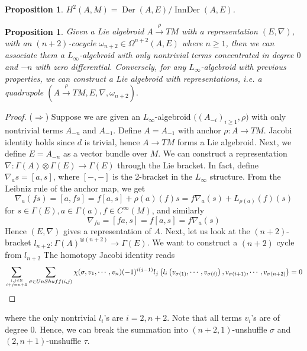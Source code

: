 \documentclass[12pt]{amsart}
\newtheorem{prop}[thm]{Proposition}
\theoremstyle{definition}
\theoremstyle{remark}
\numberwithin{equation}{section}
\newcommand{\1}{{\mathbb{1}}}
\newcommand{\der}{\operatorname{Der}}
\newcommand{\ider}{\operatorname{InnDer}}
\begin{document}
\begin{prop}
	$H^2(A,M)=\der(A,E)/\ider(A,E)$.
\end{prop}

\begin{prop}
	Given a Lie algebroid $A\stackrel{\rho}{\to} TM$ with a representation $(E, \nabla)$, with an $(n+2)$-cocycle $\omega_{n+2}\in \Omega^{n+2}(A,E)$ where $n\ge 1$, then we can associate them a $L_{\infty}$-algebroid with only nontrivial terms concentrated in degree $0$ and $-n$ with zero differential. Conversely, for any $L_{\infty}$-algebroid with previous properties, we can construct a Lie algebroid with representations, i.e. a quadrupole $(A\stackrel{\rho}{\to} TM,E, \nabla, \omega_{n+2}).$ 
\end{prop}


\begin{proof}($\Rightarrow$) Suppose we are given an $L_{\infty}$-algebroid $\big((A_{-i})_{i\ge 1},\rho \big)$ with only nontrivial terms $A_{-n}$ and $A_{-1}$. Define $A=A_{-1}$ with anchor $\rho: A\to TM$. Jacobi identity holds since $d$ is trivial, hence $A\to TM$ forms a Lie algebroid. Next, we define $E=A_{-n}$ as a vector bundle over $M$. We can construct a representation $\nabla:\Gamma(A)\otimes \Gamma(E)\to \Gamma(E)$ through the Lie bracket. In fact, define $\nabla_{a}s=[a,s]$, where $[-,-]$ is the 2-bracket in the $L_{\infty}$ structure. From the Leibniz rule of the anchor map, we get 
	\begin{equation*}
	\nabla_{a}(fs) =[a,fs]=f[a,s]+\rho(a)(f)s=f\nabla_a(s)+L_{\rho(a)}(f)(s)
	\end{equation*}
	for $s\in \Gamma(E), a\in \Gamma(a), f\in C^{\infty}(M)$, 
	and similarly
	\begin{equation*}
	\nabla_{fa}=[fa,s]=f[a,s]=f\nabla_a (s)
	\end{equation*} Hence $(E,\nabla)$ gives a representation of $A$. Next, let us look at the $(n+2)$-bracket $l_{n+2}:\Gamma(A)^{\otimes(n+2)}\to \Gamma(E)$. We want to construct a $(n+2)$ cycle from $l_{n+2}$
	The homotopy Jacobi identity reads
	\begin{equation*}
	\sum_{{i,j \in \mathbb{N}} \atop {i+j = n+3}} 
	\sum_{\sigma \in UnShuff(i,j)}
	\chi(\sigma,v_1, \cdots, v_{n})
	(-1)^{i(j-1)}
	l_{j} \left(
	l_i \left( v_{\sigma(1)}, \cdots, v_{\sigma(i)} \right),
	v_{\sigma(i+1)} , \cdots , v_{\sigma(n+2)}
	\right)
	= 0
	\end{equation*}
	\end{proof}
where the only nontrivial $l_i$'s are $i=2, n+2$. Note that all terms $v_i$'s are of degree 0. Hence, we can break the summation into $(n+2,1)$-unshuffle $\sigma$ and $(2,n+1)$-unshuffle $\tau$.
\end{document}
